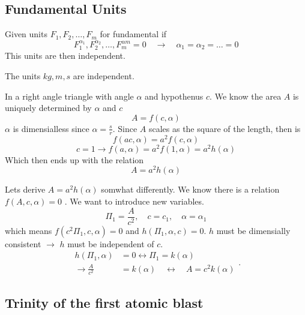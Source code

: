 \documentclass{article}
\theoremstyle{remark}
\begin{document}
\subsection{Fundamental Units}%
\label{sub:fundamental_units}

Given units $F_{1}, F_{2}, \ldots , F_{m}$ for fundamental if \[
  F_{1}^{\alpha_1}, F_{2}^{\alpha_2}, \ldots , F_{m}^{\alpha m} = 0 \quad  \to \quad  \alpha_1 = \alpha_{2} = \ldots = 0   
\] 
This units are then independent.
\begin{example}
  The units $kg, m, s$ are independent.  
\end{example}
\begin{example}
  In a right angle triangle with angle $\alpha $ and hypothenus $c$. We know the area $A$ is uniquely determined by $\alpha $ and $c$ \[
  A = f\left( c,\alpha  \right)
  \] 
  $\alpha $ is dimensialless since  $\alpha  = \frac{s}{r}$. Since $A$ scales as the square of the length, then is \[
  f\left( ac, \alpha  \right) = a^2f\left( c,\alpha  \right)
  \]   
  \[
    c = 1 \to f\left( a, \alpha  \right) = a^2f\left( 1,\alpha  \right) = a^2h\left( \alpha  \right)
  \] 
  Which then ends up with the relation \[
  A = a^2h\left( \alpha  \right)
  \] 
\end{example} 



Lets derive $A = a ^2 h\left( \alpha   \right)$ somwhat differently. We know there is a relation $f\left( A, c, \alpha  \right) = 0$ . We want to introduce new variables.\[
\Pi_1 = \frac{A}{c^2}, \quad  c = c_1, \quad \alpha = \alpha _1   
\] 
which means $f\left( c^2 \Pi_1, c, \alpha   \right) = 0$  and $h\left( \Pi_1, \alpha , c \right) = 0$. $h$ must be dimensially consistent $\to$ $h$ must be independent of $c$. 
\begin{equation*}
  \begin{split}
    h\left( \Pi_1, \alpha  \right) &= 0 \leftrightarrow \Pi_1 = k\left( \alpha  \right) \\
    \to  \frac{A}{c^2} &= k\left( \alpha  \right) \quad   \leftrightarrow \quad A = c^2k\left( \alpha  \right) 
  \end{split}
.\end{equation*}

\subsection{Trinity of the first atomic blast}%
\label{sub:trinity_of_the_first_atomic_blast}
\end{document}
